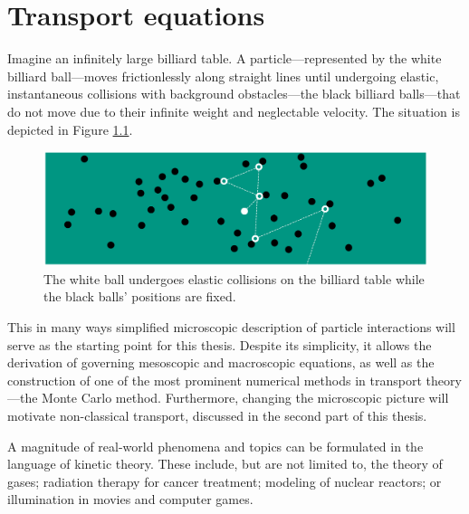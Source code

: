


\chapter{Transport equations}\label{sec:transportequations}
Imagine an infinitely large billiard table.
A particle---represented by the white billiard ball---moves frictionlessly along straight 
lines until undergoing elastic, instantaneous collisions with background 
obstacles---the black billiard balls---that do not move due to their infinite weight and neglectable velocity.
The situation is depicted in
Figure \ref{fig:particlebilliardtable}.

\begin{figure}[h!]
	\centering
	\includegraphics[width=1.0\linewidth]{Chapters/Chapter1/figs/billiardtable/particlebilliardtable}
	\caption{The white ball undergoes elastic collisions on the billiard table while the black balls' positions are fixed.}
	\label{fig:particlebilliardtable}
\end{figure}

This in many ways simplified microscopic description of particle interactions will serve as the 
starting point for this thesis. Despite its simplicity, it allows the derivation of governing 
mesoscopic and macroscopic equations, as well as the construction of one of the most 
prominent numerical methods in transport theory---the Monte Carlo method. Furthermore, 
changing the microscopic picture will motivate non-classical transport, discussed in the 
second part of this thesis.

A magnitude of real-world phenomena and topics can be formulated in the language of kinetic 
theory. These include, but are not limited to, the theory of gases; radiation therapy for cancer 
treatment; modeling of nuclear reactors; or illumination in movies and computer games.

